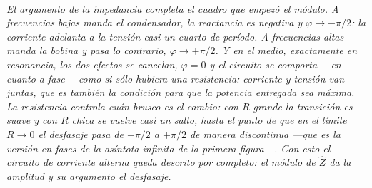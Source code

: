 \begin{center}
\\[0.5em]
{\small\itshape El argumento de la impedancia completa el cuadro que empezó el
módulo. A frecuencias bajas manda el condensador, la reactancia es negativa y
$\varphi \to -\pi/2$: la corriente adelanta a la tensión casi un cuarto de
período. A frecuencias altas manda la bobina y pasa lo contrario,
$\varphi \to +\pi/2$. Y en el medio, exactamente en resonancia, los dos efectos
se cancelan, $\varphi = 0$ y el circuito se comporta ---en cuanto a fase--- como
si sólo hubiera una resistencia: corriente y tensión van juntas, que es también
la condición para que la potencia entregada sea máxima. La resistencia controla
cuán brusco es el cambio: con $R$ grande la transición es suave y con $R$ chica
se vuelve casi un salto, hasta el punto de que en el límite $R\to 0$ el
desfasaje pasa de $-\pi/2$ a $+\pi/2$ de manera discontinua ---que es la versión
en fases de la asíntota infinita de la primera figura---. Con esto el circuito
de corriente alterna queda descrito por completo: el módulo de $\hat Z$ da la
amplitud y su argumento el desfasaje.}
\end{center}

